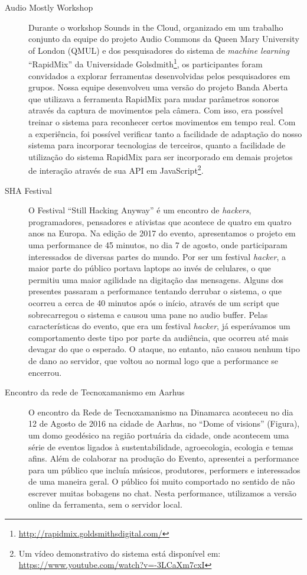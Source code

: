 \begin{description}
\item[Audio Mostly Workshop]
Durante o workshop Sounds in the Cloud, organizado em um trabalho conjunto da equipe do projeto Audio Commons da Queen Mary University of London (QMUL) e dos pesquisadores do sistema de \emph{machine learning} ``RapidMix'' da Universidade Golsdmith\footnote{\url{http://rapidmix.goldsmithsdigital.com/}}, os participantes foram convidados a explorar ferramentas desenvolvidas pelos pesquisadores em grupos. Nossa equipe desenvolveu uma versão do projeto Banda Aberta que utilizava a ferramenta RapidMix para mudar parâmetros sonoros através da captura de movimentos pela câmera. Com isso, era possível treinar o sistema para reconhecer certos movimentos em tempo real. Com a experiência, foi possível verificar tanto a facilidade de adaptação do nosso sistema para incorporar tecnologias de terceiros, quanto a facilidade de utilização do sistema RapidMix para ser incorporado em demais projetos de interação através de sua API em JavaScript\footnote{Um vídeo demonstrativo do sistema está disponível em: \url{https://www.youtube.com/watch?v=-3LCaXm7cxI}}.

\item[SHA Festival] O Festival ``Still Hacking Anyway'' é um encontro de \emph{hackers}, programadores, pensadores e ativistas que acontece de quatro em quatro anos na Europa. Na edição de 2017 do evento, apresentamos o projeto em uma performance de 45 minutos, no dia 7 de agosto, onde participaram interessados de diversas partes do mundo. Por ser um festival \emph{hacker}, a maior parte do público portava laptops ao invés de celulares, o que permitiu uma maior agilidade na digitação das mensagens. Alguns dos presentes passaram a performance tentando derrubar o sistema, o que ocorreu a cerca de 40 minutos após o início, através de um script que sobrecarregou o sistema e causou uma pane no audio buffer. Pelas características do evento, que era um festival \emph{hacker},  já esperávamos um comportamento deste tipo por parte da audiência, que ocorreu até mais devagar do que o esperado. O ataque, no entanto, não causou nenhum tipo de dano ao servidor, que voltou ao normal logo que a performance se encerrou.

\item[Encontro da rede de Tecnoxamanismo em Aarhus] O encontro da Rede de Tecnoxamanismo na Dinamarca aconteceu no dia 12 de Agosto de 2016 na cidade de Aarhus, no ``Dome of visions'' (Figura), um domo geodésico na região portuária da cidade, onde acontecem uma série de eventos ligados à sustentabilidade, agroecologia, ecologia e temas afins. Além de colaborar na produção do Evento, apresentei a performance para um público que incluía músicos, produtores, performers e interessados de uma maneira geral. O público foi muito comportado no sentido de não escrever muitas bobagens no chat. Nesta performance, utilizamos a versão online da ferramenta, sem o servidor local.


\end{description}
